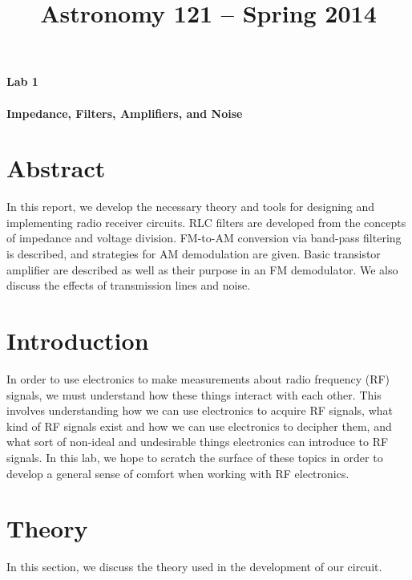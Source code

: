 \documentclass[11pt]{article}
\title{Astronomy 121 -- Spring 2014}
\author{\Name}
\begin{document}
\maketitle
\begin{center}
{\LARGE
{\bf Lab 1 \\~\\

Impedance, Filters, Amplifiers, and Noise
}
}
\end{center}

\newpage
\section{Abstract}
In this report, we develop the necessary theory and tools for designing and implementing radio receiver circuits. RLC filters are developed from the concepts of impedance and voltage division. FM-to-AM conversion via band-pass filtering is described, and strategies for AM demodulation are given. Basic transistor amplifier are described as well as their purpose in an FM demodulator. We also discuss the effects of transmission lines and noise.

\section{Introduction}
In order to use electronics to make measurements about radio frequency (RF) signals, we must understand how these things interact with each other. This involves understanding how we can use electronics to acquire RF signals, what kind of RF signals exist and how we can use electronics to decipher them, and what sort of non-ideal and undesirable things electronics can introduce to RF signals. In this lab, we hope to scratch the surface of these topics in order to develop a general sense of comfort when working with RF electronics.

\section{Theory}
In this section, we discuss the theory used in the development of our circuit.
\end{document}
